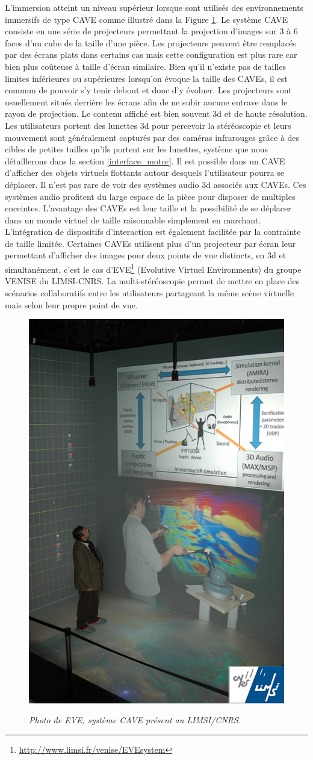 L'immersion atteint un niveau supérieur lorsque sont utilisés des environnements immersifs de type CAVE \cite{cruz-neira_cave:_1992} comme illustré dans la Figure \ref{Fig:eve_cave_system}. Le système CAVE consiste en une série de projecteurs permettant la projection d'images sur 3 à 6 faces d'un cube de la taille d'une pièce. Les projecteurs peuvent être remplacés par des écrans plats dans certains cas mais cette configuration est plus rare car bien plus coûteuse à taille d'écran similaire. Bien qu'il n'existe pas de tailles limites inférieures ou supérieures lorsqu'on évoque la taille des CAVEs, il est commun de pouvoir s'y tenir debout et donc d'y évoluer. Les projecteurs sont usuellement situés derrière les écrans afin de ne subir aucune entrave dans le rayon de projection. Le contenu affiché est bien souvent 3d et de haute résolution. Les utilisateurs portent des lunettes 3d pour percevoir la stéréoscopie et leurs mouvement sont généralement capturés par des caméras infrarouges grâce à des cibles de petites tailles qu'ils portent sur les lunettes, système que nous détaillerons dans la section \ref{interface_motor}. Il est possible dans un CAVE d'afficher des objets virtuels flottants autour desquels l'utilisateur pourra se déplacer.
Il n'est pas rare de voir des systèmes audio 3d associés aux CAVEs. Ces systèmes audio profitent du large espace de la pièce pour disposer de multiples enceintes.
L'avantage des CAVEs est leur taille et la possibilité de se déplacer dans un monde virtuel de taille raisonnable simplement en marchant. L'intégration de dispositifs d'interaction est également facilitée par la contrainte de taille limitée. 
Certaines CAVEs utilisent plus d'un projecteur par écran leur permettant d'afficher des images pour deux points de vue distincts, en 3d et simultanément, c'est le cas d'EVE\footnote{\url{http://www.limsi.fr/venise/EVEsystem}} (Evolutive Virtuel Environments) du groupe VENISE du LIMSI-CNRS. La multi-stéréoscopie permet de mettre en place des scénarios collaboratifs entre les utilisateurs partageant la même scène virtuelle mais selon leur propre point de vue.

\begin{figure}
  \centering
  {\includegraphics[width=.35\linewidth]{./figures/ch2/eve_cave_system}}
    \caption{{\it Photo de EVE, système CAVE présent au LIMSI/CNRS.}}
  \label{Fig:eve_cave_system}
  \hspace{0.3cm}
\end{figure}

